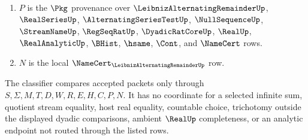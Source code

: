\begin{definition}
\begin{enumerate}
$$$$
\item $P$ is the $\Pkg$ provenance over $\LeibnizAlternatingRemainderUp$, $\RealSeriesUp$, $\AlternatingSeriesTestUp$, $\NullSequenceUp$, $\StreamNameUp$, $\RegSeqRatUp$, $\DyadicRatCoreUp$, $\RealUp$, $\RealAnalyticUp$, $\BHist$, $\hsame$, $\Cont$, and $\NameCert$ rows.
\item $N$ is the local $\NameCert_{\LeibnizAlternatingRemainderUp}$ row.
\end{enumerate}
The classifier compares accepted packets only through $S,\Sigma,M,T,D,W,R,E,H,C,P,N$. It has no coordinate for a selected infinite sum, quotient stream equality, host real equality, countable choice, trichotomy outside the displayed dyadic comparisons, ambient $\RealUp$ completeness, or an analytic endpoint not routed through the listed rows.
\end{definition}

